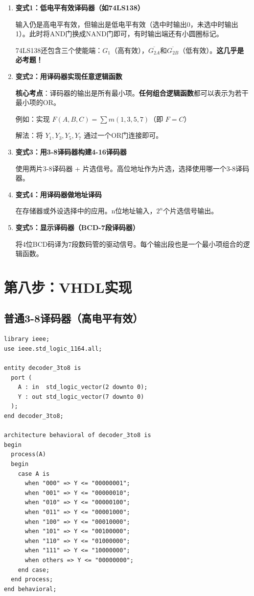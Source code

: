 \begin{enumerate}
  \item \textbf{变式1：低电平有效译码器（如74LS138）}

  输入仍是高电平有效，但输出是低电平有效（选中时输出0，未选中时输出1）。此时将AND门换成NAND门即可，有时输出端还有小圆圈标记。

  74LS138还包含三个使能端：$G_1$（高有效），$\overline{G_{2A}}$和$\overline{G_{2B}}$（低有效）。\textbf{这几乎是必考题！}

  \item \textbf{变式2：用译码器实现任意逻辑函数}

  \textbf{核心考点}：译码器的输出是所有最小项。\textbf{任何组合逻辑函数}都可以表示为若干最小项的OR。

  例如：实现 $F(A,B,C) = \sum m(1,3,5,7)$（即 $F = C$）

  解法：将 $Y_1, Y_3, Y_5, Y_7$ 通过一个OR门连接即可。

  \item \textbf{变式3：用3-8译码器构建4-16译码器}

  使用两片3-8译码器 + 片选信号。高位地址作为片选，选择使用哪一个3-8译码器。

  \item \textbf{变式4：用译码器做地址译码}

  在存储器或外设选择中的应用。n位地址输入，$2^n$个片选信号输出。

  \item \textbf{变式5：显示译码器（BCD-7段译码器）}

  将4位BCD码译为7段数码管的驱动信号。每个输出段也是一个最小项组合的逻辑函数。
\end{enumerate}

\section{第八步：VHDL实现}

\subsection{普通3-8译码器（高电平有效）}

\begin{lstlisting}[caption={3-8译码器（case实现）}]
library ieee;
use ieee.std_logic_1164.all;

entity decoder_3to8 is
  port (
    A : in  std_logic_vector(2 downto 0);
    Y : out std_logic_vector(7 downto 0)
  );
end decoder_3to8;

architecture behavioral of decoder_3to8 is
begin
  process(A)
  begin
    case A is
      when "000" => Y <= "00000001";
      when "001" => Y <= "00000010";
      when "010" => Y <= "00000100";
      when "011" => Y <= "00001000";
      when "100" => Y <= "00010000";
      when "101" => Y <= "00100000";
      when "110" => Y <= "01000000";
      when "111" => Y <= "10000000";
      when others => Y <= "00000000";
    end case;
  end process;
end behavioral;
\end{lstlisting}

